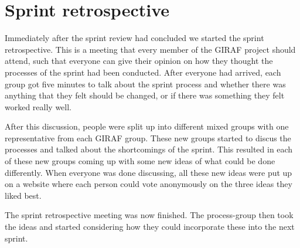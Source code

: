 \section{Sprint retrospective}

Immediately after the sprint review had concluded we started the sprint retrospective. 
This is a meeting that every member of the GIRAF project should attend, such that everyone can give their opinion on how they thought the processes of the sprint had been conducted.
After everyone had arrived, each group got five minutes to talk about the sprint process and whether there was anything that they felt should be changed, or if there was something they felt worked really well.

After this discussion, people were split up into different mixed groups with one representative from each GIRAF group. 
These new groups started to discus the processes and talked about the shortcomings of the sprint. 
This resulted in each of these new groups coming up with some new ideas of what could be done differently.
When everyone was done discussing, all these new ideas were put up on a website where each person could vote anonymously on the three ideas they liked best.

The sprint retrospective meeting was now finished. 
The process-group then took the ideas and started considering how they could incorporate these into the next sprint.
